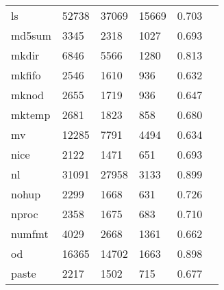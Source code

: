 \begin{longtable}{lp{2.4cm}p{2.4cm}p{2.4cm}p{2.4cm}p{2.4cm}}
ls        &                                   52738 &                       37069 &                        15669 &                                   0.703 \\
md5sum    &                                    3345 &                        2318 &                         1027 &                                   0.693 \\
mkdir     &                                    6846 &                        5566 &                         1280 &                                   0.813 \\
mkfifo    &                                    2546 &                        1610 &                          936 &                                   0.632 \\
mknod     &                                    2655 &                        1719 &                          936 &                                   0.647 \\
mktemp    &                                    2681 &                        1823 &                          858 &                                   0.680 \\
mv        &                                   12285 &                        7791 &                         4494 &                                   0.634 \\
nice      &                                    2122 &                        1471 &                          651 &                                   0.693 \\
nl        &                                   31091 &                       27958 &                         3133 &                                   0.899 \\
nohup     &                                    2299 &                        1668 &                          631 &                                   0.726 \\
nproc     &                                    2358 &                        1675 &                          683 &                                   0.710 \\
numfmt    &                                    4029 &                        2668 &                         1361 &                                   0.662 \\
od        &                                   16365 &                       14702 &                         1663 &                                   0.898 \\
paste     &                                    2217 &                        1502 &                          715 &                                   0.677 \\

\end{longtable}
